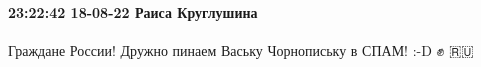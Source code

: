  
 
 
 
 

\paragraph{23:22:42 18-08-22 Раиса Круглушина}

Граждане России! Дружно пинаем Ваську Чорнопиську в СПАМ! :-D ✊ 🇷🇺
